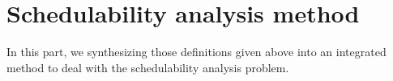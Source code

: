 \documentclass[sigconf]{acmart}
\begin{document}

\section{Schedulability analysis method}
In this part, we synthesizing those definitions given above into an integrated method to deal with the schedulability analysis problem.
\end{document}
